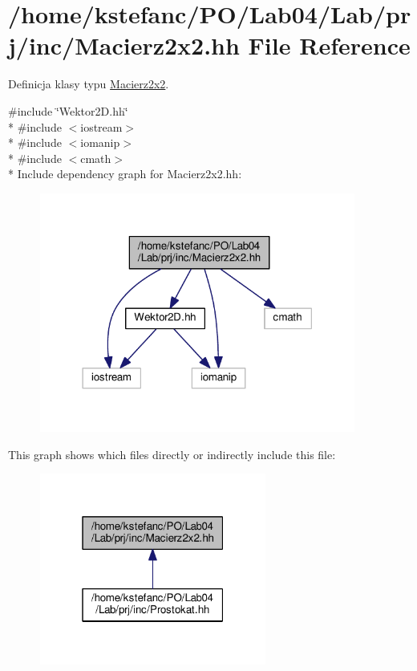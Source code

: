\hypertarget{_macierz2x2_8hh}{\section{/home/kstefanc/\+P\+O/\+Lab04/\+Lab/prj/inc/\+Macierz2x2.hh File Reference}
\label{_macierz2x2_8hh}
}


Definicja klasy typu \hyperlink{class_macierz2x2}{Macierz2x2}.  


{\ttfamily \#include \char`\"{}Wektor2\+D.\+hh\char`\"{}}\\*
{\ttfamily \#include $<$iostream$>$}\\*
{\ttfamily \#include $<$iomanip$>$}\\*
{\ttfamily \#include $<$cmath$>$}\\*
Include dependency graph for Macierz2x2.\+hh\+:\nopagebreak
\begin{figure}[H]
\begin{center}
\leavevmode
\includegraphics[width=294pt]{_macierz2x2_8hh__incl}
\end{center}
\end{figure}
This graph shows which files directly or indirectly include this file\+:\nopagebreak
\begin{figure}[H]
\begin{center}
\leavevmode
\includegraphics[width=211pt]{_macierz2x2_8hh__dep__incl}
\end{center}
\end{figure}
